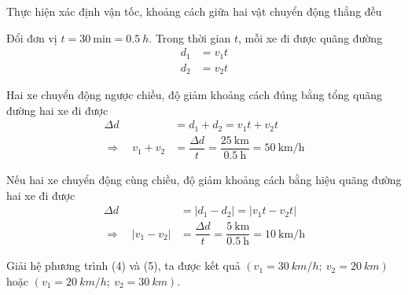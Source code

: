 \begin{dang}{Thực hiện xác định vận tốc, khoảng cách giữa hai vật chuyển động thẳng đều}
{		Đổi đơn vị  $t=\SI{30}{\minute} = \SI{0.5}{h}$.
		Trong thời gian $t$, mỗi xe đi được quãng đường 
			\begin{align*}
				d_1&=v_1t\\
				d_2&=v_2t
			\end{align*}
		
		Hai xe chuyển động ngược chiều, độ giảm khoảng cách đúng bằng tổng quãng đường hai xe đi được
			\begin{align}
				\Delta d&=d_1+d_2=v_1t + v_2t\nonumber\\
				\Rightarrow\quad v_1+v_2&=\dfrac{\Delta d}{t}=\dfrac{\SI{25}{\kilo\meter}}{\SI{0.5}{\hour}}=\SI{50}{\kilo\meter/\hour}
			\end{align} 
		
		Nếu hai xe chuyển động cùng chiều, độ giảm khoảng cách bằng hiệu quãng đường hai xe đi được 
			\begin{align}
				\Delta d&=|d_1-d_2|=|v_1t - v_2t|\nonumber\\
				\Rightarrow\quad |v_1-v_2|&=\dfrac{\Delta d}{t}=\dfrac{\SI{5}{\kilo\meter}}{\SI{0.5}{\hour}}=\SI{10}{\kilo\meter/\hour}
			\end{align} 
		
		Giải hệ phương trình (4) và (5), ta được kết quả $(v_1 =\SI{30}{km/h};\ v_2 =\SI{20}{km})$ hoặc $(v_1 =\SI{20}{km/h};\ v_2 =\SI{30}{km})$.
	}
\end{dang}
